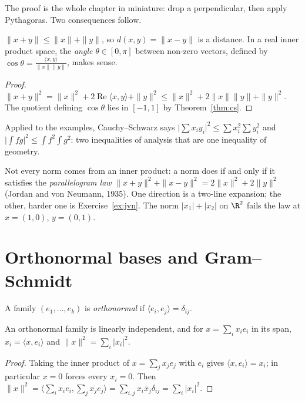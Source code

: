 The proof is the whole chapter in miniature: drop a perpendicular, then apply Pythagoras. Two consequences follow.

\begin{corollary}\label{cor:triangle}
$\|x+y\|\le\|x\|+\|y\|$, so $d(x,y)=\|x-y\|$ is a distance. In a real inner product space, the \emph{angle}
$\theta\in[0,\pi]$ between non-zero vectors, defined by $\cos\theta=\frac{\langle x,y\rangle}{\|x\|\|y\|}$, makes sense.
\end{corollary}
\begin{proof}
$\|x+y\|^2=\|x\|^2+2\operatorname{Re}\langle x,y\rangle+\|y\|^2\le\|x\|^2+2\|x\|\|y\|+\|y\|^2$. The quotient defining
$\cos\theta$ lies in $[-1,1]$ by Theorem~\ref{thm:cs}.
\end{proof}

Applied to the examples, Cauchy--Schwarz says $\bigl|\sum x_iy_i\bigr|^2\le\sum x_i^2\sum y_i^2$ and
$\bigl|\int fg\bigr|^2\le\int f^2\int g^2$: two inequalities of analysis that are one inequality of geometry.

\begin{remark}
Not every norm comes from an inner product: a norm does if and only if it satisfies the \emph{parallelogram law}
$\|x+y\|^2+\|x-y\|^2=2\|x\|^2+2\|y\|^2$ (Jordan and von Neumann, 1935). One direction is a two-line expansion; the other,
harder one is Exercise~\ref{ex:jvn}. The norm $|x_1|+|x_2|$ on $\R^2$ fails the law at $x=(1,0)$, $y=(0,1)$.
\end{remark}

\section{Orthonormal bases and Gram--Schmidt}

A family $(e_1,\dots,e_k)$ is \emph{orthonormal} if $\langle e_i,e_j\rangle=\delta_{ij}$.

\begin{proposition}\label{prop:orthfamily}
An orthonormal family is linearly independent, and for $x=\sum_i x_ie_i$ in its span, $x_i=\langle x,e_i\rangle$ and
$\|x\|^2=\sum_i|x_i|^2$.
\end{proposition}
\begin{proof}
Taking the inner product of $x=\sum_jx_je_j$ with $e_i$ gives $\langle x,e_i\rangle=x_i$; in particular $x=0$ forces
every $x_i=0$. Then $\|x\|^2=\langle\sum_ix_ie_i,\sum_jx_je_j\rangle=\sum_{i,j}x_i\bar x_j\delta_{ij}=\sum_i|x_i|^2$.
\end{proof}

